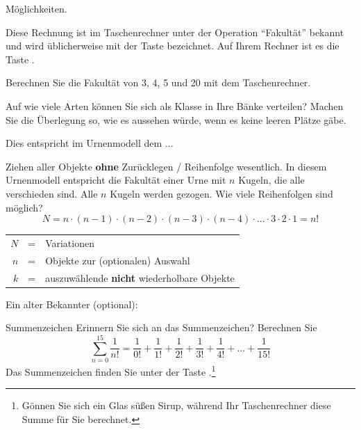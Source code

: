 Möglichkeiten.

Diese Rechnung ist im Taschenrechner unter der Operation ``Fakultät''
bekannt und wird üblicherweise mit der Taste  bezeichnet. Auf
Ihrem Rechner ist es die Taste .

Berechnen Sie die Fakultät von 3, 4, 5 und 20 mit dem Taschenrechner.


Auf wie viele Arten können Sie sich als Klasse in Ihre Bänke
verteilen? Machen Sie die Überlegung so, wie es aussehen würde, wenn es keine leeren Plätze gäbe.


Dies entspricht im Urnenmodell dem ...
\begin{gesetz}{Ziehen aller Objekte \textbf{ohne} Zurücklegen / Reihenfolge wesentlich.}{}
In diesem Urnenmodell entspricht die Fakultät einer Urne mit $n$ Kugeln, die
alle verschieden sind. Alle $n$ Kugeln werden gezogen. Wie viele
Reihenfolgen sind möglich?
$$N = n\cdot{} (n-1) \cdot{} (n-2) \cdot{} (n-3) \cdot{}
(n-4) \cdot{} ... \cdot{} 3\cdot{} 2 \cdot{} 1 = n!$$

\begin{tabular}{rcl}
  $N$ &=& Variationen\\
  $n$ &=& Objekte zur (optionalen) Auswahl\\
  $k$ &=& auszuwählende \textbf{nicht} wiederholbare Objekte\\
\end{tabular}

\end{gesetz}
\newpage


Ein alter Bekannter (optional):

\vspace{3mm}

\begin{bemerkung}{Summenzeichen}{}
Erinnern Sie sich an das Summenzeichen? Berechnen
Sie $$\sum_{n=0}^{15}\frac{1}{n!} = \frac{1}{0!} + \frac{1}{1!}
+ \frac1{2!} + \frac1{3!} + \frac1{4!} + ... + \frac1{15!}$$ Das Summenzeichen finden Sie unter
der Taste .\footnote{Gönnen Sie sich
ein Glas süßen Sirup, während Ihr Taschenrechner diese Summe für Sie berechnet.}
\end{bemerkung}

